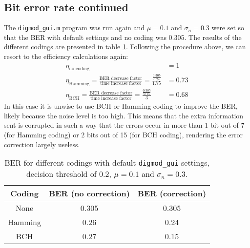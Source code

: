 \documentclass[11pt,titlepage]{report}
\begin{document}
\subsection{Bit error rate continued}
The \texttt{digmod\_gui.m} program was run again and $\mu=0.1$ and $\sigma_n=0.3$ were set so that the BER with default settings and no coding was \num{0.305}. The results of the different codings are presented in table \ref{tab:task4-diff-coding-mu-sigma}. Following the procedure above, we can resort to the efficiency calculations again:
\begin{align*}
\eta_{\text{no coding}}&=1\\
\eta_{\text{Hamming}}=\frac{\text{BER decrease factor}}{\text{time increase factor}}=\frac{\frac{0.305}{0.24}}{1.75}&=0.73\\
\eta_{\text{BCH}}=\frac{\text{BER decrease factor}}{\text{time increase factor}}=\frac{\frac{0.305}{0.15}}{3}&=0.68
\end{align*}
In this case it is unwise to use BCH or Hamming coding to improve the BER, likely because the noise level is too high. This means that the extra information sent is corrupted in such a way that the errors occur in more than \num{1} bit out of \num{7} (for Hamming coding) or \num{2} bits out of \num{15} (for BCH coding), rendering the error correction largely useless.
\begin{table}[H]
	\centering
	\caption{BER for different codings with default \texttt{digmod\_gui} settings, decision threshold of 0.2, $\mu=0.1$ and $\sigma_n=0.3$.}
	\label{tab:task4-diff-coding-mu-sigma}
	\begin{tabular}{c c c}
		\hline\hline
		Coding & BER (no correction) & BER (correction)\\
		\hline
		None & 0.305 & 0.305\\
		Hamming & 0.26 & 0.24 \\
		BCH & 0.27 & 0.15\\
		\hline
	\end{tabular}
\end{table}
\end{document}
